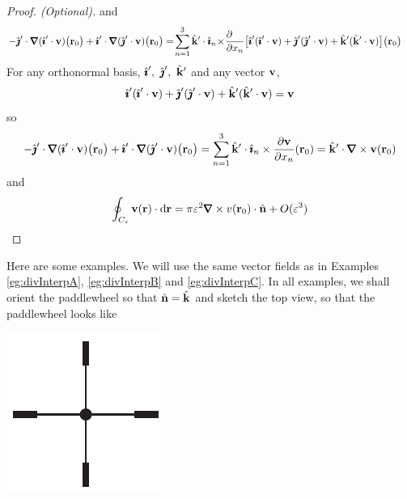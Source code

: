 \begin{proof}[Proof. (Optional)]
{and
\begin{align*}
-\hj'\cdot\vnabla(\hi'\cdot\vv)\big(\vr_0\big)+\hi'\cdot\vnabla(\hj'\cdot\vv)
         \big(\vr_0\big)
&=\!\sum_{n=1}^3 \hk'\cdot \hi_n\!\times\!
\frac{\partial \hfill}{\partial x_n}
\big[\hi'(\hi'\cdot\vv)
+\hj'(\hj'\cdot\vv)
+\hk'(\hk'\cdot\vv)\big]\big(\vr_0\big)
\end{align*}
For any orthonormal basis, $\hat{\pmb{\imath}}',\ \hat{\pmb{\jmath}}',\ \hat{\mathbf{k}}'$ and any vector $\mathbf{v}$,
\begin{equation*}
\hat{\pmb{\imath}}'(\hat{\pmb{\imath}}'\cdot\mathbf{v})
+\hat{\pmb{\jmath}}'(\hat{\pmb{\jmath}}'\cdot\mathbf{v})
+\hat{\mathbf{k}}'(\hat{\mathbf{k}}'\cdot\mathbf{v})=\mathbf{v}
\end{equation*}
so
\begin{equation*}
-\hj'\cdot\vnabla(\hi'\cdot\vv)\big(\vr_0\big)+\hi'\cdot\vnabla(\hj'\cdot\vv)\big(\vr_0\big)
=\sum_{n=1}^3 \hk'\cdot \hi_n\times
\frac{\partial \vv}{\partial x_n}(\vr_0)
=\hk'\cdot\vnabla\times \vv(\vr_0)
\end{equation*}
and
\begin{equation*}
\oint_{C_\veps} \vv(\vr)\cdot \dee{\vr} =\pi\veps^2\vnabla\times v(\vr_0)\cdot \hn
+O(\veps^3)
\end{equation*}
}

\end{proof}

Here are some examples. We will use the same vector fields as in Examples
\ref{eg:divInterpA}, \ref{eg:divInterpB} and \ref{eg:divInterpC}.
In all examples, we shall orient the paddlewheel so that $\hat{\mathbf{n}}=\hat{\mathbf{k}}$
and sketch the top view, so that the paddlewheel looks like
\begin{nfig}
\begin{center}
    \includegraphics{paddlewheelTop.pdf}
\end{center}
\end{nfig}



